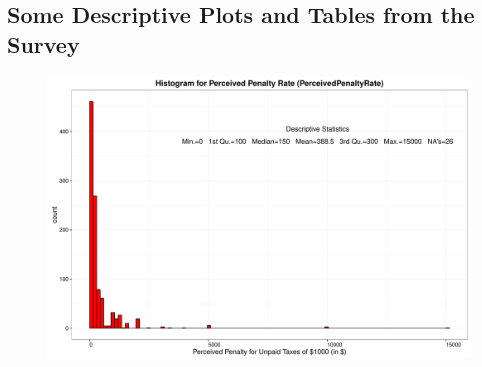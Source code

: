\documentclass{NSF_proposal_mod}
\begin{document}
\subsection{Some Descriptive Plots and Tables from the Survey}
\begin{figure}[!h]
\centering
 \includegraphics[width=5in]{HistPerceivedPenaltyRate.pdf} 
   \label{Fig:PerceivedPenaltyRate}
\caption{}
\end{figure}

\clearpage 
{}
\renewcommand{\thepage} {Ref--\arabic{page}}

%


\end{document}
